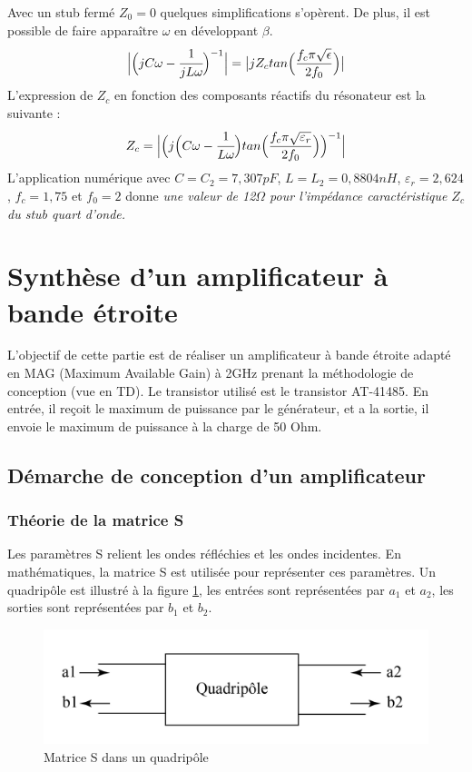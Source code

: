 \documentclass[french]{article}
\begin{document}
Avec un stub fermé $Z_0=0$ quelques simplifications s'opèrent. De plus, il est possible de faire apparaître $\omega$ en développant $\beta$. 
\begin{equation}
	\Big|\Big(jC\omega-\cfrac{1}{jL\omega}\Big)^{-1}\Big|=\big|jZ_ctan\Big(\frac{f_c\pi\sqrt{\epsilon}}{2f_0}\Big)\big|
\end{equation}
L'expression de $Z_c $ en fonction des composants réactifs du résonateur est la suivante :
\begin{equation}
	Z_c=\Big|\Big(j\Big(C\omega-\cfrac{1}{L\omega}\Big)tan\Big(\frac{f_c\pi\sqrt{\varepsilon_r}}{2f_0}\Big)\Big)^{-1}\Big|
\end{equation}
L'application numérique avec $C=C_2=7,307pF$, $L=L_2=0,8804nH$, $\varepsilon_r=2,624$, $f_c=1,75$ et $f_0=2$ donne \emph{une valeur de 12$\Omega$ pour l'impédance caractéristique $Z_c$ du stub quart d'onde.} 

\newpage
\section{Synthèse d'un amplificateur à bande étroite}
L’objectif de cette partie est de réaliser un amplificateur à bande étroite adapté en MAG (Maximum Available Gain) à 2GHz prenant la méthodologie de conception (vue en TD). Le transistor utilisé est le transistor AT-41485. En entrée, il reçoit le maximum de puissance par le générateur, et a la sortie, il envoie le maximum de puissance à la charge de 50 Ohm.

\subsection{Démarche de conception d’un amplificateur}


\subsubsection{Théorie de la matrice S}
Les paramètres S relient les ondes réfléchies et les ondes incidentes. En mathématiques, la matrice S est utilisée pour représenter ces paramètres. Un quadripôle est illustré à la figure \ref{fig:matrice_s}, les entrées sont représentées par $a_{1}$ et $a_{2}$, les sorties sont représentées par $b_{1}$ et $b_{2}$. 

\begin{figure}[H]
	\centering
	\includegraphics[width=0.9\linewidth]{../5SynthAmp/Matrice_S}
	\caption{Matrice S dans un quadripôle}
	\label{fig:matrice_s}
\end{figure}
\end{document}
